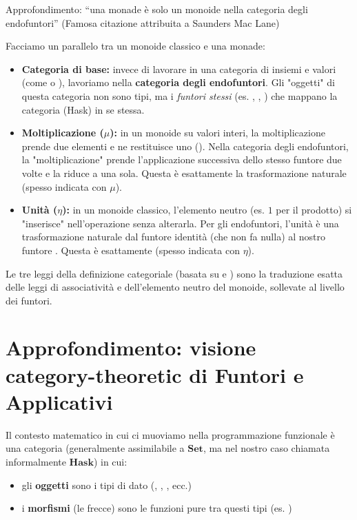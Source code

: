 \begin{gframe}{Approfondimento: ``una monade è solo un monoide nella categoria degli endofuntori''}
    (Famosa citazione attribuita a Saunders Mac Lane)  

    Facciamo un parallelo tra un monoide classico e una monade:

\begin{itemize}
    \item \textbf{Categoria di base:} invece di lavorare in una categoria di insiemi e valori (come  o ), lavoriamo nella \textbf{categoria degli endofuntori}. Gli "oggetti" di questa categoria non sono tipi, ma i \textit{funtori stessi} (es. \code{[]}, , ) che mappano la categoria (Hask) in se stessa.
    
    \item \textbf{Moltiplicazione ($\mu$):} in un monoide su valori interi, la moltiplicazione prende due elementi e ne restituisce uno (). Nella categoria degli endofuntori, la "moltiplicazione" prende l'applicazione successiva dello stesso funtore due volte e la riduce a una sola. Questa è esattamente la trasformazione naturale \textbf{} (spesso indicata con $\mu$).
    
    \item \textbf{Unità ($\eta$):} in un monoide classico, l'elemento neutro (es. $1$ per il prodotto) si "inserisce" nell'operazione senza alterarla. Per gli endofuntori, l'unità è una trasformazione naturale dal funtore identità (che non fa nulla) al nostro funtore . Questa è esattamente \textbf{} (spesso indicata con $\eta$).
\end{itemize}

Le tre leggi della definizione categoriale (basata su  e ) sono la traduzione esatta delle leggi di associatività e dell'elemento neutro del monoide, sollevate al livello dei funtori. 
\end{gframe}


\section{Approfondimento: visione category-theoretic di Funtori e Applicativi}
Il contesto matematico in cui ci muoviamo nella programmazione funzionale è una categoria (generalmente assimilabile a $\mathbf{Set}$, ma nel nostro caso chiamata informalmente $\mathbf{Hask}$) in cui:
\begin{itemize}
    \item gli \textbf{oggetti} sono i tipi di dato (, , , ecc.)
    \item i \textbf{morfismi} (le frecce) sono le funzioni pure tra questi tipi (es. )
\end{itemize}

